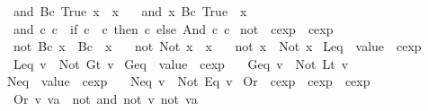 \begin{isabellebody}
\ \ {\isachardoublequoteopen}and\ {\isacharparenleft}Bc\ True{\isacharparenright}\ x\ {\isacharequal}\ x{\isachardoublequoteclose}\ {\isacharbar}\isanewline
\ \ {\isachardoublequoteopen}and\ x\ {\isacharparenleft}Bc\ True{\isacharparenright}\ {\isacharequal}\ x{\isachardoublequoteclose}\ {\isacharbar}\isanewline
\ \ {\isachardoublequoteopen}and\ c\ c{\isacharprime}\ {\isacharequal}\ {\isacharparenleft}if\ c\ {\isacharequal}\ c{\isacharprime}\ then\ c\ else\ And\ c\ c{\isacharprime}{\isacharparenright}{\isachardoublequoteclose}\isanewline
\isanewline
{}\isamarkupfalse%
\ {\isachardoublequoteopen}not{\isachardoublequoteclose}\ {\isacharcolon}{\isacharcolon}\ {\isachardoublequoteopen}cexp\ {\isasymRightarrow}\ cexp{\isachardoublequoteclose}\ \isanewline
\ \ {\isachardoublequoteopen}not\ {\isacharparenleft}Bc\ x{\isacharparenright}\ {\isacharequal}\ {\isacharparenleft}Bc\ {\isacharparenleft}{\isasymnot}\ x{\isacharparenright}{\isacharparenright}{\isachardoublequoteclose}\ {\isacharbar}\isanewline
\ \ {\isachardoublequoteopen}not\ {\isacharparenleft}Not\ x{\isacharparenright}\ {\isacharequal}\ x{\isachardoublequoteclose}\ {\isacharbar}\isanewline
\ \ {\isachardoublequoteopen}not\ x\ {\isacharequal}\ Not\ x{\isachardoublequoteclose}\isanewline
\isanewline
{}\isamarkupfalse%
\ Leq\ {\isacharcolon}{\isacharcolon}\ {\isachardoublequoteopen}value\ {\isasymRightarrow}\ cexp{\isachardoublequoteclose}\ \isanewline
\ \ {\isachardoublequoteopen}Leq\ v\ {\isasymequiv}\ Not\ {\isacharparenleft}Gt\ v{\isacharparenright}{\isachardoublequoteclose}\isanewline
\isanewline
{}\isamarkupfalse%
\ Geq\ {\isacharcolon}{\isacharcolon}\ {\isachardoublequoteopen}value\ {\isasymRightarrow}\ cexp{\isachardoublequoteclose}\ \isanewline
\ \ {\isachardoublequoteopen}Geq\ v\ {\isasymequiv}\ Not\ {\isacharparenleft}Lt\ v{\isacharparenright}{\isachardoublequoteclose}\isanewline
\isanewline
{}\isamarkupfalse%
\ Neq\ {\isacharcolon}{\isacharcolon}\ {\isachardoublequoteopen}value\ {\isasymRightarrow}\ cexp{\isachardoublequoteclose}\ \isanewline
\ \ {\isachardoublequoteopen}Neq\ v\ {\isasymequiv}\ Not\ {\isacharparenleft}Eq\ v{\isacharparenright}{\isachardoublequoteclose}\isanewline
\isanewline
{}\isamarkupfalse%
\ Or\ {\isacharcolon}{\isacharcolon}\ {\isachardoublequoteopen}cexp\ {\isasymRightarrow}\ cexp\ {\isasymRightarrow}\ cexp{\isachardoublequoteclose}\ \isanewline
\ \ {\isachardoublequoteopen}Or\ v\ va\ {\isasymequiv}\ not\ {\isacharparenleft}and\ {\isacharparenleft}not\ v{\isacharparenright}\ {\isacharparenleft}not\ va{\isacharparenright}{\isacharparenright}{\isachardoublequoteclose}\isanewline

\end{isabellebody}
